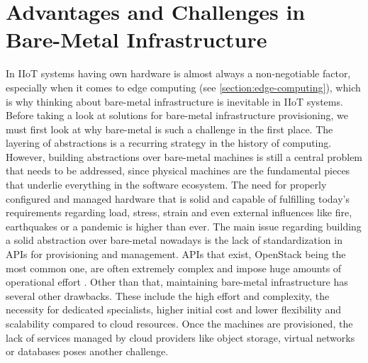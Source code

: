 \section{Advantages and Challenges in Bare-Metal Infrastructure}

    In IIoT systems having own hardware is almost always a non-negotiable factor, especially when it comes to edge computing (see \autoref{section:edge-computing}), which is why thinking about bare-metal infrastructure is inevitable in IIoT systems. Before taking a look at solutions for bare-metal infrastructure provisioning, we must first look at why bare-metal is such a challenge in the first place. The layering of abstractions is a recurring strategy in the history of computing. However, building abstractions over bare-metal machines is still a central problem that needs to be addressed, since physical machines are the fundamental pieces that underlie everything in the software ecosystem. The need for properly configured and managed hardware that is solid and capable of fulfilling today's requirements regarding load, stress, strain and even external influences like fire, earthquakes or a pandemic is higher than ever. The main issue regarding building a solid abstraction over bare-metal nowadays is the lack of standardization in APIs for provisioning and management. APIs that exist, OpenStack being the most common one, are often extremely complex and impose huge amounts of operational effort \cite{building_future_on_metal}. Other than that, maintaining bare-metal infrastructure has several other drawbacks. These include the high effort and complexity, the necessity for dedicated specialists, higher initial cost and lower flexibility and scalability compared to cloud resources. Once the machines are provisioned, the lack of services managed by cloud providers like object storage, virtual networks or databases poses another challenge. \newline

